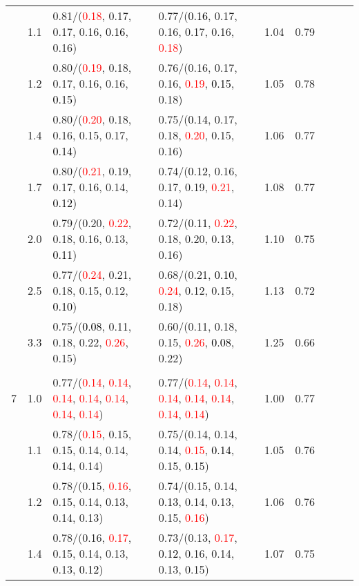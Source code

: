 \documentclass[10pt,a4paper]{report}
\begin{document}
\begin{table}[!htbp]
\begin{center}
{\begin{tabular}{ccllccccc}
			&1.1&0.81/(\textcolor{red}{0.18}, 0.17, 0.17, 0.16, \textcolor{black}{0.16}, 0.16)&0.77/(\textcolor{black}{0.16}, 0.17, 0.16, 0.17, 0.16, \textcolor{red}{0.18})&1.04&0.79\\
			&1.2&0.80/(\textcolor{red}{0.19}, 0.18, 0.17, 0.16, 0.16, \textcolor{black}{0.15})&0.76/(0.16, 0.17, 0.16, \textcolor{red}{0.19}, \textcolor{black}{0.15}, 0.18)&1.05&0.78\\
			&1.4&0.80/(\textcolor{red}{0.20}, 0.18, 0.16, 0.15, 0.17, \textcolor{black}{0.14})&0.75/(\textcolor{black}{0.14}, 0.17, 0.18, \textcolor{red}{0.20}, 0.15, 0.16)&1.06&0.77\\
			&1.7&0.80/(\textcolor{red}{0.21}, 0.19, 0.17, 0.16, 0.14, \textcolor{black}{0.12})&0.74/(\textcolor{black}{0.12}, 0.16, 0.17, 0.19, \textcolor{red}{0.21}, 0.14)&1.08&0.77\\
			&2.0&0.79/(0.20, \textcolor{red}{0.22}, 0.18, 0.16, 0.13, \textcolor{black}{0.11})&0.72/(\textcolor{black}{0.11}, \textcolor{red}{0.22}, 0.18, 0.20, 0.13, 0.16)&1.10&0.75\\
			&2.5&0.77/(\textcolor{red}{0.24}, 0.21, 0.18, 0.15, 0.12, \textcolor{black}{0.10})&0.68/(0.21, \textcolor{black}{0.10}, \textcolor{red}{0.24}, 0.12, 0.15, 0.18)&1.13&0.72\\
			&3.3&0.75/(\textcolor{black}{0.08}, 0.11, 0.18, 0.22, \textcolor{red}{0.26}, 0.15)&0.60/(0.11, 0.18, 0.15, \textcolor{red}{0.26}, \textcolor{black}{0.08}, 0.22)&1.25&0.66\\
			&&&&\\
			7			&1.0&0.77/(\textcolor{red}{0.14}, \textcolor{red}{0.14}, \textcolor{red}{0.14}, \textcolor{red}{0.14}, \textcolor{red}{0.14}, \textcolor{red}{0.14}, \textcolor{red}{0.14})&0.77/(\textcolor{red}{0.14}, \textcolor{red}{0.14}, \textcolor{red}{0.14}, \textcolor{red}{0.14}, \textcolor{red}{0.14}, \textcolor{red}{0.14}, \textcolor{red}{0.14})&1.00&0.77\\
			&1.1&0.78/(\textcolor{red}{0.15}, 0.15, 0.15, 0.14, 0.14, \textcolor{black}{0.14}, 0.14)&0.75/(0.14, 0.14, 0.14, \textcolor{red}{0.15}, \textcolor{black}{0.14}, 0.15, 0.15)&1.05&0.76\\
			&1.2&0.78/(0.15, \textcolor{red}{0.16}, 0.15, 0.14, \textcolor{black}{0.13}, 0.14, 0.13)&0.74/(0.15, 0.14, \textcolor{black}{0.13}, 0.14, 0.13, 0.15, \textcolor{red}{0.16})&1.06&0.76\\
			&1.4&0.78/(0.16, \textcolor{red}{0.17}, 0.15, 0.14, 0.13, 0.13, \textcolor{black}{0.12})&0.73/(0.13, \textcolor{red}{0.17}, \textcolor{black}{0.12}, 0.16, 0.14, 0.13, 0.15)&1.07&0.75\\

\end{tabular}}
\end{center}
\end{table}
\end{document}
